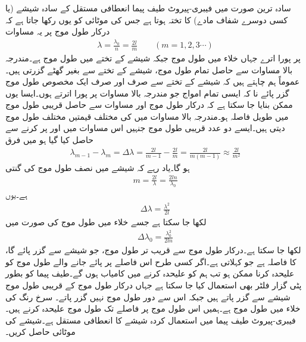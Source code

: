 سادہ ترین صورت میں فیبری-پیروٹ طیف پیما  انعطافی مستقل کے  سادہ شیشے (یا کسی دوسرے شفاف مادے) کا تختہ ہوتا ہے جس کی موٹائی  کو یوں رکھا جاتا ہے کہ درکار طول موج پر یہ مساوات 
\begin{align}\label{مساوات_مستوی_فیبری_پیروٹ_الف}
\lambda=\frac{\lambda_0}{n}=\frac{2l}{m} \quad \quad (m=1,2,3\cdots)
\end{align}
 پر پورا اترے جہاں خلاء میں طول موج  جبکہ شیشے کے تختے میں طول موج  ہے۔مندرجہ بالا مساوات سے حاصل تمام طول موج، شیشے کے تختے سے بغیر گھٹے گزرتی ہیں۔عموماً ہم چاہتے ہیں کہ شیشے کے تختے سے صرف اور صرف ایک مخصوص طول موج گزر پائے نا کہ ایسی تمام امواج جو مندرجہ بالا مساوات پر پورا اترتے ہوں۔ایسا یوں ممکن بنایا جا سکتا ہے کہ درکار طول موج اور مساوات  سے حاصل قریبی طول موج میں طویل فاصلہ ہو۔مندرجہ بالا مساوات میں  کی مختلف قیمتیں مختلف طول موج دیتی ہیں۔ایسے دو عدد قریبی طول موج جنہیں اس مساوات میں   اور  پر کرنے سے حاصل کیا گیا ہو میں فرق 
\begin{align}
\lambda_{m-1}-\lambda_m=\Delta \lambda=\frac{2l}{m-1}-\frac{2l}{m}=\frac{2l}{m(m-1)} \approx \frac{2l}{m^2}
\end{align}
ہو گا۔یاد رہے کہ  شیشے میں نصف طول موج کی گنتی
\begin{align}
m=\frac{2l}{\lambda}=\frac{2ln}{\lambda_0}
\end{align}
ہے۔یوں
\begin{align}
\Delta \lambda=\frac{\lambda^2}{2l}
\end{align}
لکھا جا سکتا ہے جسے خلاء میں طول موج  کی صورت میں
\begin{align}
\Delta \lambda_0=\frac{\lambda_0^2}{2ln}
\end{align}
لکھا جا سکتا ہے۔درکار طول موج  سے قریب تر طول موج، جو شیشے سے گزر پائے گا، کا فاصلہ  ہے جو  کہلاتی ہے۔اگر کسی طرح اس فاصلے پر پائے جانے والے  طول موج کو علیحدہ کرنا ممکن ہو تب ہم  کو علیحدہ کرنے میں کامیاب ہوں گے۔طیف پیما کو بطور پٹی گزار فلٹر بھی استعمال کیا جا سکتا ہے جہاں درکار طول موج کے قریبی طول موج شیشے سے گزر پاتے ہیں جبکہ اس سے دور طول موج نہیں گزر پاتے۔
سرخ رنگ کی خلاء میں طول موج  ہے۔ہمیں اس طول موج پر  فاصلے تک طول موج علیحدہ کرنے ہیں۔فیبری-پیروٹ طیف پیما میں استعمال کردہ شیشے کا انعطافی مستقل  ہے۔شیشے کی موٹائی حاصل کریں۔


